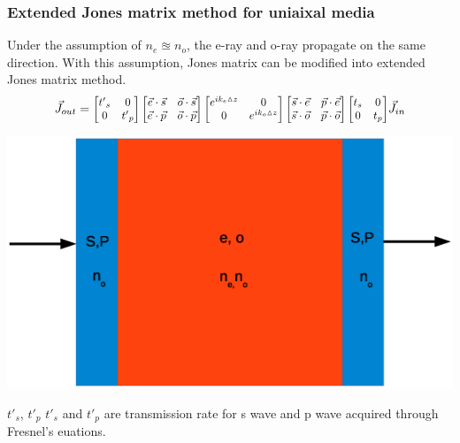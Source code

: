 \documentclass{beamer}
\newcommand\scalemath[2]{\scalebox{#1}{\mbox{\ensuremath{\displaystyle #2}}}} %
\begin{document}
\begin{frame}
\frametitle{Extended Jones matrix method for uniaixal media}
Under the assumption of $n_e \approxeq n_o$, the e-ray and o-ray propagate on the same direction. With this assumption, Jones matrix can be modified into extended Jones matrix method.
\begin{eqnarray}
\vec{J}_{out} = 
\scalemath{0.9}{
\begin{bmatrix}
{t'}_s & 0 \\ 0 & {t'}_p
\end{bmatrix}
\begin{bmatrix}
\vec{e}\cdot\vec{s} & \vec{o}\cdot\vec{s} \\ \vec{e}\cdot\vec{p} & \vec{o}\cdot\vec{p}
\end{bmatrix}
\begin{bmatrix}
e^{ik_e\vartriangle z} & 0 \\ 0 & e^{ik_o\vartriangle z}
\end{bmatrix}
\begin{bmatrix}
\vec{s}\cdot\vec{e} & \vec{p}\cdot\vec{e} \\ \vec{s}\cdot\vec{o} & \vec{p}\cdot\vec{o}
\end{bmatrix}
\begin{bmatrix}
t_s & 0 \\ 0 & t_p
\end{bmatrix}
}
\vec{J}_{in} \nonumber
\nonumber
\label{eq:extendedJones}
\end{eqnarray}
\begin{center}
\includegraphics[scale=0.25]{extj_uniaxial.eps}
\end{center}
${t'}_s$, ${t'}_p$ ${t'}_s$ and ${t'}_p$ are transmission rate for s wave and p wave acquired through Fresnel's euations.

\end{frame}
\end{document}
